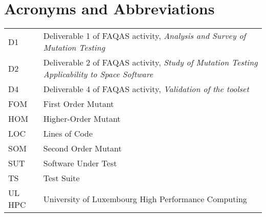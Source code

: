 
\section{Acronyms and Abbreviations}
\label{sec:acronyms}


\begin{tabular}{|p{1.5cm}|p{14.5cm}|}

D1& Deliverable 1 of FAQAS activity, \emph{Analysis and Survey of Mutation Testing}\\
D2& Deliverable 2 of FAQAS activity, \emph{Study of Mutation Testing Applicability to Space Software}\\
D4& Deliverable 4 of FAQAS activity, \emph{Validation of the toolset}\\
FOM & First Order Mutant\\
HOM & Higher-Order Mutant\\
LOC & Lines of Code\\
SOM & Second Order Mutant\\
SUT & Software Under Test\\
TS & Test Suite\\
UL HPC & University of Luxembourg High Performance Computing


                                                           
\end{tabular}
\normalsize

\clearpage